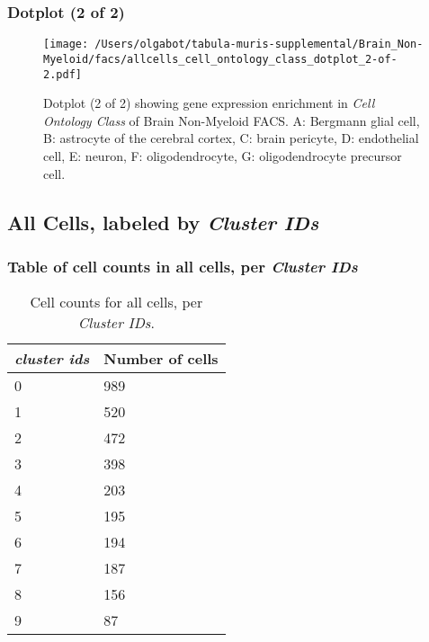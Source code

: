 \subsubsection{Dotplot (2 of 2)}
\begin{figure}[h]
\centering
\texttt{[image: /Users/olgabot/tabula-muris-supplemental/Brain\_Non-Myeloid/facs/allcells\_cell\_ontology\_class\_dotplot\_2-of-2.pdf]}

\caption{ Dotplot (2 of 2)  showing gene expression enrichment in \emph{Cell Ontology Class} of Brain Non-Myeloid FACS. A: Bergmann glial cell, B: astrocyte of the cerebral cortex, C: brain pericyte, D: endothelial cell, E: neuron, F: oligodendrocyte, G: oligodendrocyte precursor cell.}
\end{figure}


\clearpage
\subsection{All Cells, labeled by \emph{Cluster IDs}}
\subsubsection{Table of cell counts in all cells, per \emph{Cluster IDs}}\begin{table}[h]
\centering
\label{my-label}
\begin{tabular}{@{}ll@{}}
\toprule

\emph{cluster ids}& Number of cells \\ \midrule
0 & 989 \\

1 & 520 \\

2 & 472 \\

3 & 398 \\

4 & 203 \\

5 & 195 \\

6 & 194 \\

7 & 187 \\

8 & 156 \\

9 & 87 \\
\bottomrule
\end{tabular}
\caption{Cell counts for all cells, per \emph{Cluster IDs}.}
\end{table}

